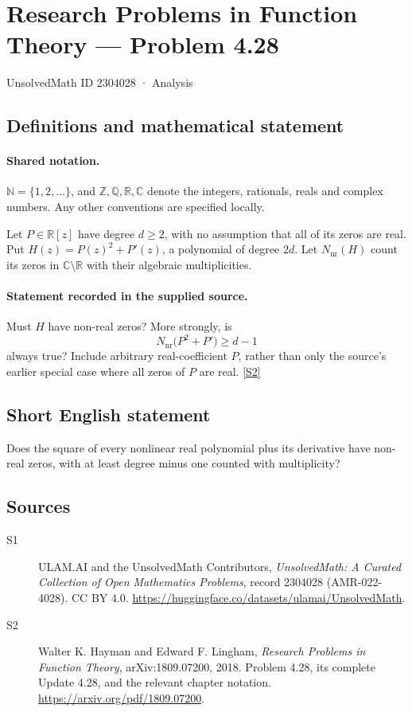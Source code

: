 \documentclass[11pt]{book}
\newcommand{\sref}[2]{\hyperlink{source:#1:#2}{[S#2]}}
\begin{document}
\setcounter{section}{2304027}
\section{Research Problems in Function Theory — Problem 4.28}\label{2304028}
{\small\sffamily UnsolvedMath ID 2304028 · Analysis}
\subsection{Definitions and mathematical statement}

\paragraph{Shared notation.}$\mathbb N=\{1,2,\ldots\}$, and $\mathbb Z,\mathbb Q,\mathbb R,\mathbb C$ denote the integers, rationals, reals and complex numbers. Any other conventions are specified locally.


Let $P\in\mathbb R[z]$ have degree $d\ge2$, with no assumption that all of its zeros are real. Put $H(z)=P(z)^2+P'(z)$, a polynomial of degree $2d$. Let $N_{\mathrm{nr}}(H)$ count its zeros in $\mathbb C\setminus\mathbb R$ with their algebraic multiplicities.
\paragraph{Statement recorded in the supplied source.}
Must $H$ have non-real zeros? More strongly, is
\[N_{\mathrm{nr}}\bigl(P^2+P'\bigr)\ge d-1\]
always true? Include arbitrary real-coefficient $P$, rather than only the source's earlier special case where all zeros of $P$ are real. \sref{2304028}{2}
\subsection{Short English statement}
Does the square of every nonlinear real polynomial plus its derivative have non-real zeros, with at least degree minus one counted with multiplicity?
\subsection{Sources}
\begin{description}
\item[\hypertarget{source:2304028:1}{S1}] ULAM.AI and the UnsolvedMath Contributors, \emph{UnsolvedMath: A Curated Collection of Open Mathematics Problems}, record 2304028 (AMR-022-4028). CC BY 4.0. \url{https://huggingface.co/datasets/ulamai/UnsolvedMath}.
\item[\hypertarget{source:2304028:2}{S2}] Walter K. Hayman and Edward F. Lingham, \emph{Research Problems in Function Theory}, arXiv:1809.07200, 2018. Problem 4.28, its complete Update 4.28, and the relevant chapter notation. \url{https://arxiv.org/pdf/1809.07200}.
\end{description}
\label{end:2304028}
\end{document}
